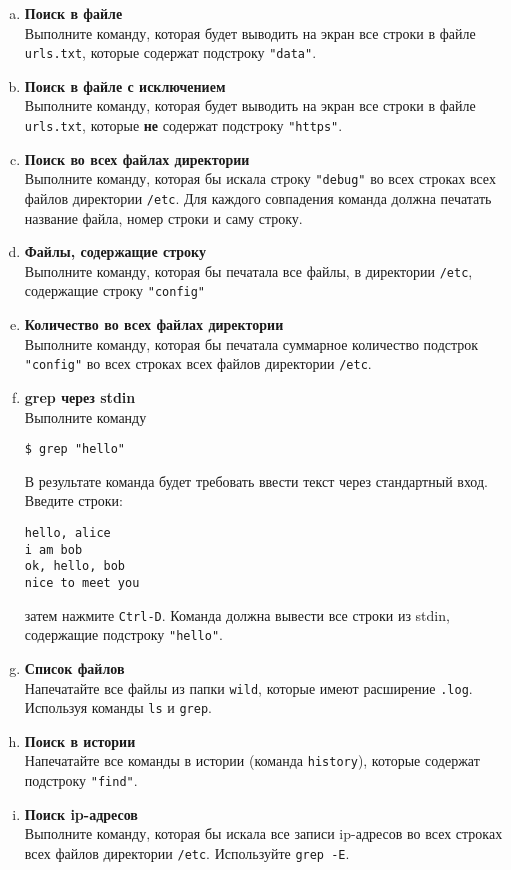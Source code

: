 \documentclass{article}
\begin{document}
\begin{enumerate}[a.]
\item \textbf{Поиск в файле}\\
Выполните команду, которая будет выводить на экран все строки в файле \texttt{urls.txt}, которые содержат подстроку \texttt{"data"}.

\item \textbf{Поиск в файле с исключением}\\
Выполните команду, которая будет выводить на экран все строки в файле \texttt{urls.txt}, которые \textbf{не} содержат подстроку \texttt{"https"}.

\item \textbf{Поиск во всех файлах директории}\\
Выполните команду, которая бы искала строку \texttt{"debug"} во всех строках всех файлов директории \texttt{/etc}. Для каждого совпадения команда должна печатать название файла, номер строки и саму строку.

\item \textbf{Файлы, содержащие строку}\\
Выполните команду, которая бы печатала все файлы, в директории \texttt{/etc}, содержащие строку \texttt{"config"} 

\item \textbf{Количество во всех файлах директории}\\
Выполните команду, которая бы печатала суммарное количество подстрок \texttt{"config"} во всех строках всех файлов директории \texttt{/etc}. 

\item \textbf{grep через stdin}\\
Выполните команду
\begin{lstlisting}
$ grep "hello"
\end{lstlisting}
В результате команда будет требовать ввести текст через стандартный вход. Введите строки:
\begin{lstlisting}
hello, alice
i am bob
ok, hello, bob
nice to meet you
\end{lstlisting}
затем нажмите \texttt{Ctrl-D}. Команда должна вывести все строки из stdin, содержащие подстроку \texttt{"hello"}.

\item \textbf{Список файлов}\\
Напечатайте все файлы из папки \texttt{wild}, которые имеют расширение \texttt{.log}. Используя команды \texttt{ls} и \texttt{grep}.

\item \textbf{Поиск в истории}\\
Напечатайте все команды в истории (команда \texttt{history}), которые содержат подстроку \texttt{"find"}.

\item \textbf{Поиск ip-адресов}\\
Выполните команду, которая бы искала все записи ip-адресов во всех строках всех файлов директории \texttt{/etc}. Используйте \texttt{grep -E}.
\end{enumerate}
\end{document}
